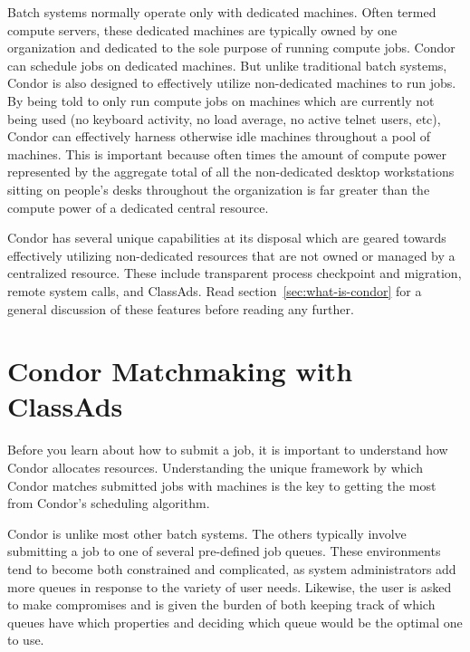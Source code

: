 Batch systems normally operate only with dedicated machines.  Often 
termed compute servers, these dedicated machines are typically owned by
one organization and dedicated to the sole purpose of running compute
jobs.  Condor can schedule jobs on dedicated machines.  But unlike traditional 
batch systems, Condor is also designed to effectively 
utilize non-dedicated machines to run jobs.  By being told to only
run compute jobs on machines which are currently not being used (no keyboard
activity, no load average, no active telnet users, etc), Condor can
effectively harness otherwise idle machines throughout a pool of machines.
This is important because often times the amount of
compute power represented by the aggregate total of all the non-dedicated 
desktop workstations sitting on people's desks throughout the
organization is far greater than the compute power of a dedicated
central resource.

Condor has several unique capabilities at its disposal which are geared 
towards effectively utilizing non-dedicated resources that are not owned or
managed by a centralized resource. These include transparent process
checkpoint and migration, remote system calls, and ClassAds.
Read section~\ref{sec:what-is-condor} for a general 
discussion of these features before reading any further.


\section{Condor Matchmaking with ClassAds}

Before you learn about how to submit a job, it is important to
understand how Condor allocates resources. 
Understanding the
unique framework by which Condor matches submitted jobs with machines is
the key to getting the most from Condor's scheduling algorithm. 

Condor is unlike most other batch systems. The others typically involve
submitting a job to one of several pre-defined job queues. These
environments tend to become both constrained and complicated, as
system administrators add more queues in response to the
variety of user needs. Likewise, the user is asked to make compromises
and is given the burden of both keeping track of which queues
have which properties and deciding which queue would be the
optimal one to use.


